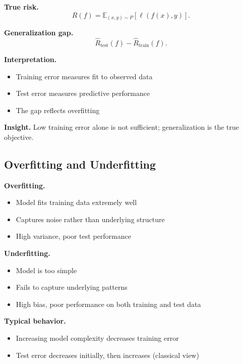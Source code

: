 \noindent
\textbf{True risk.}
\[
R(f) = \mathbb{E}_{(x,y)\sim P}[\ell(f(x), y)].
\]

\medskip

\noindent
\textbf{Generalization gap.}
\[
\hat{R}_{\text{test}}(f) - \hat{R}_{\text{train}}(f).
\]

\medskip

\noindent
\textbf{Interpretation.}
\begin{itemize}
    \item Training error measures fit to observed data
    \item Test error measures predictive performance
    \item The gap reflects overfitting
\end{itemize}

\medskip

\noindent
\textbf{Insight.}  
Low training error alone is not sufficient; generalization is the true objective.

\subsection{Overfitting and Underfitting}

\textbf{Overfitting.}
\begin{itemize}
    \item Model fits training data extremely well
    \item Captures noise rather than underlying structure
    \item High variance, poor test performance
\end{itemize}

\medskip

\noindent
\textbf{Underfitting.}
\begin{itemize}
    \item Model is too simple
    \item Fails to capture underlying patterns
    \item High bias, poor performance on both training and test data
\end{itemize}

\medskip

\noindent
\textbf{Typical behavior.}
\begin{itemize}
    \item Increasing model complexity decreases training error
    \item Test error decreases initially, then increases (classical view)
\end{itemize}

